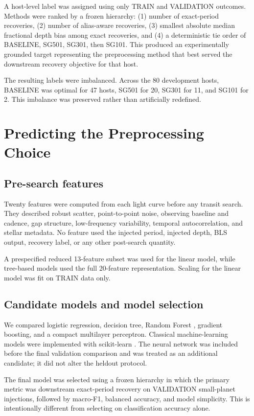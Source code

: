 \documentclass[10pt,twocolumn]{article}
\begin{document}
A host-level label was assigned using only TRAIN and VALIDATION outcomes. Methods were ranked by a frozen hierarchy: (1) number of exact-period recoveries, (2) number of alias-aware recoveries, (3) smallest absolute median fractional depth bias among exact recoveries, and (4) a deterministic tie order of BASELINE, SG501, SG301, then SG101. This produced an experimentally grounded target representing the preprocessing method that best served the downstream recovery objective for that host.

The resulting labels were imbalanced. Across the 80 development hosts, BASELINE was optimal for 47 hosts, SG501 for 20, SG301 for 11, and SG101 for 2. This imbalance was preserved rather than artificially redefined.

\section{Predicting the Preprocessing Choice}

\subsection{Pre-search features}

Twenty features were computed from each light curve before any transit search. They described robust scatter, point-to-point noise, observing baseline and cadence, gap structure, low-frequency variability, temporal autocorrelation, and stellar metadata. No feature used the injected period, injected depth, BLS output, recovery label, or any other post-search quantity.

A prespecified reduced 13-feature subset was used for the linear model, while tree-based models used the full 20-feature representation. Scaling for the linear model was fit on TRAIN data only.

\subsection{Candidate models and model selection}

We compared logistic regression, decision tree, Random Forest \cite{breiman2001}, gradient boosting, and a compact multilayer perceptron. Classical machine-learning models were implemented with scikit-learn \cite{pedregosa2011}. The neural network was included before the final validation comparison and was treated as an additional candidate; it did not alter the heldout protocol.

The final model was selected using a frozen hierarchy in which the primary metric was downstream exact-period recovery on VALIDATION small-planet injections, followed by macro-F1, balanced accuracy, and model simplicity. This is intentionally different from selecting on classification accuracy alone.
\end{document}
